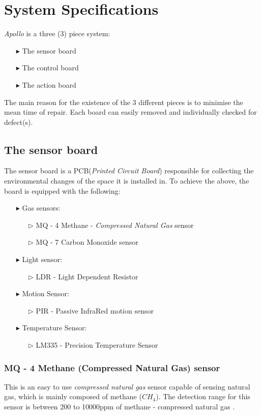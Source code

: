 \documentclass[12pt,a4paper]{report}
\begin{document}
\chapter{System Specifications}
%
\emph{Apollo} is a three (3) piece system:
%
\begin{itemize}
\item[$\blacktriangleright$] The sensor board
\item[$\blacktriangleright$] The control board
\item[$\blacktriangleright$] The action board
\end{itemize}
The main reason for the existence of the 3 different pieces is to minimise the mean time of repair. Each board can easily removed and individually checked for defect(s).
%
\section{The sensor board}
%
The sensor board is a PCB(\textit{Printed Circuit Board}) responsible for collecting the environmental changes of the space it is installed in. To achieve the above, the board is equipped with the following:
%
\begin{itemize}
\item[$\blacktriangleright$]Gas sensors:
	\begin{itemize}
	\item[$\triangleright$] MQ - 4 Methane - \textit{Compressed Natural Gas} sensor
	\item[$\triangleright$] MQ - 7 Carbon Monoxide  sensor
	\end{itemize}
\item[$\blacktriangleright$]Light sensor:
	\begin{itemize}
	\item[$\triangleright$]LDR - Light Dependent Resistor
	\end{itemize}
\item[$\blacktriangleright$]Motion Sensor:
	\begin{itemize}
	\item[$\triangleright$]PIR - Passive InfraRed motion sensor 
	\end{itemize}
\item[$\blacktriangleright$]Temperature Sensor:
	\begin{itemize}
	\item[$\triangleright$]LM335 - Precision Temperature Sensor
	\end{itemize}
\end{itemize}
%
\subsection{MQ - 4 Methane (Compressed Natural Gas) sensor}
%
This is an easy to use \emph{compressed natural gas} sensor capable of sensing natural gas, which is mainly composed of methane ($CH_4$). The detection range for this sensor is between 200 to 10000ppm of methane  - compressed natural gas \cite{website:mq4}.
\end{document}
